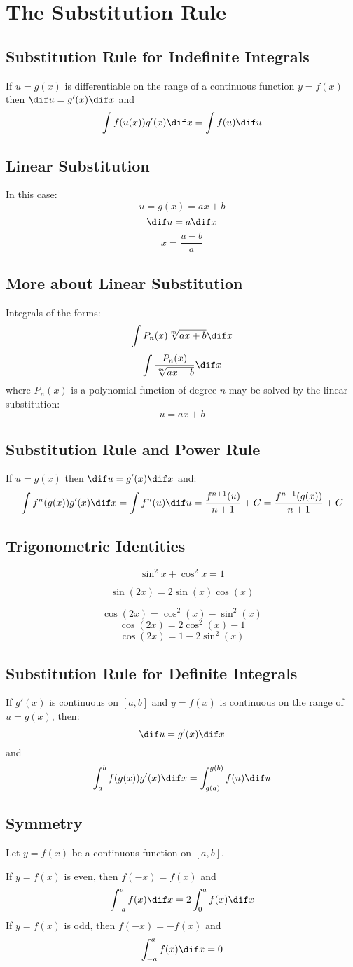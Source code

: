 \section{The Substitution Rule}
\subsection{Substitution Rule for Indefinite Integrals}
	If $u=g(x)$ is differentiable on the range of a continuous function $y=f(x)$ then $\dif u = g'(x) \dif x$ and
	\[\int f(u(x))g'(x) \dif x = \int f(u) \dif u\]
\subsection{Linear Substitution}
	In this case:
	\[u = g(x) = ax+b\]
	\[\dif u = a \dif x\]
	\[x = \frac{u-b}{a}\]
\subsection{More about Linear Substitution}
	Integrals of the forms:
	\[\int P_n(x) \sqrt[m]{ax + b} \dif x\]
	\[\int \frac{P_n(x)}{\sqrt[m]{ax + b}} \dif x\]
	where $P_n(x)$ is a polynomial function of degree $n$ may be solved by the linear substitution:
	\[u = ax + b\]
\subsection{Substitution Rule and Power Rule}
	If $u=g(x)$ then $\dif u = g'(x) \dif x$ and:
	\[\int f^n(g(x))g'(x) \dif x = \int f^n(u) \dif u = \frac{f^{n+1}(u)}{n+1} + C = \frac{f^{n+1}(g(x))}{n+1} + C\]
\subsection{Trigonometric Identities}
	\[\sin^2 x + \cos^2 x = 1\]

	\[\sin(2x) = 2\sin(x)\cos(x)\]

	\[\cos(2x) = \cos^2(x) - \sin^2(x)\]
	\[\cos(2x) = 2\cos^2(x) - 1\]
	\[\cos(2x) = 1 - 2\sin^2(x)\]
\subsection{Substitution Rule for Definite Integrals}
	If $g'(x)$ is continuous on $[a,b]$ and $y=f(x)$ is continuous on the range of $u=g(x)$, then:
	\[\dif u = g'(x) \dif x\]
	and
	\[\int_a^b f(g(x))g'(x) \dif x = \int_{g(a)}^{g(b)} f(u) \dif u\]
\subsection{Symmetry}
	Let $y=f(x)$ be a continuous function on $[a,b]$.

	If $y=f(x)$ is even, then $f(-x)=f(x)$ and
	\[\int_{-a}^a f(x) \dif x = 2\int_0^a f(x) \dif x\]
	If $y=f(x)$ is odd, then $f(-x)=-f(x)$ and
	\[\int_{-a}^a f(x) \dif x = 0\]
